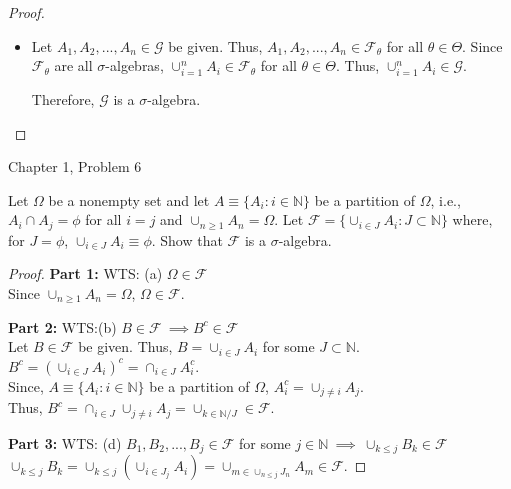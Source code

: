\documentclass[12pt,letterpaper, onecolumn]{exam}
\newcommand{\nat}{\mathbb{N}}
\newcommand{\sigmaF}{\mathcal{F}}
\newcommand{\sigmaG}{\mathcal{G}}
\begin{document}
\begin{questions}
\begin{solution}
\begin{proof}
\begin{itemize}
    Thus, $\sigmaG$ is an algebra on $\Omega$, by definition.
    
        \item[(d)] Let $A_1, A_2, ... , A_n \in \sigmaG$ be given. Thus, $A_1, A_2, ... , A_n \in \sigmaF_\theta$ for all $\theta \in \Theta$. Since $\sigmaF_\theta$ are all $\sigma$-algebras, $\cup_{i=1}^n A_i \in \sigmaF_\theta$ for all $\theta \in \Theta$. Thus, $\cup_{i=1}^n A_i \in \sigmaG$.

        Therefore, $\sigmaG$ is a $\sigma$-algebra.
    \end{itemize}
    \end{proof}    
    \end{solution}

    \question Chapter 1, Problem 6
    
    Let $\Omega$ be a nonempty set and let $A\equiv\{A_i : i \in \nat\}$ be a partition of $\Omega$, i.e., $A_i \cap A_j = \phi$ for all $i = j$ and $\cup_{n\geq 1} A_n =\Omega$. Let $\sigmaF = \{\cup_{i\in J} A_i : J  \subset  \nat\}$ where, for $J = \phi$, $\cup_{i\in J} A_i \equiv\phi$. Show that $\sigmaF$ is a $\sigma$-algebra.

    \begin{solution}
        \begin{proof}
            \textbf{Part 1:} WTS: (a) $\Omega \in \sigmaF$ \\
            Since $\cup_{n\geq 1} A_n =\Omega$, $\Omega \in \sigmaF$.

            \textbf{Part 2:} WTS:(b) $B \in \sigmaF \: \implies B^c \in \sigmaF$ \\
            Let $B \in \sigmaF$ be given. Thus, $B = \cup_{i \in J}A_i$ for some $J \subset \nat$. \\
            $B^c = (\cup_{i \in J}A_i)^c = \cap_{i \in J}A_i^c.$ \\
            Since, $A\equiv\{A_i : i \in \nat\}$ be a partition of $\Omega$, $A_i^c = \cup_{j \neq i}A_j$. \\
            Thus, $B^c = \cap_{i \in J}\cup_{j \neq i}A_j = \cup_{k \in \nat/J} \in \sigmaF.$

            \textbf{Part 3:} WTS: (d) $B_1, B_2, ... , B_j \in \sigmaF $ for some $j \in \nat \: \implies \: \cup_{k \leq j}B_k \in \sigmaF$ \\
            $\cup_{k \leq j}B_k = \cup_{k \leq j}(\cup_{i\in J_j} A_i) = \cup_{m \in \cup_{n \leq j}J_n}A_m \in \sigmaF$. 


\end{proof}
\end{solution}
\end{questions}
\end{document}
